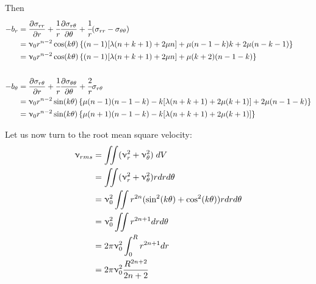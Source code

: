 Then 
\begin{align}
-b_r &=
\frac{\partial \sigma_{rr}}{\partial r} + \cfrac{1}{r}\frac{\partial \sigma_{r\theta}}{\partial \theta} +
\cfrac{1}{r}(\sigma_{rr}-\sigma_{\theta\theta})  
\nonumber\\
&= \upnu_0 r^{n-2} \cos(k\theta) 
\left\{
(n-1)[\lambda (n+k+1)+2\mu n]
+ \mu   (n-1-k)k  
+ 2 \mu( n-k-1)  
\right\}
\nonumber\\
&= \upnu_0 r^{n-2} \cos(k\theta) 
\left\{
(n-1)[\lambda (n+k+1)+2\mu n]
+ \mu (k+2)  (n-1-k)  
\right\}
\nonumber\\\nonumber\\
-b_\theta&=
\frac{\partial \sigma_{r\theta}}{\partial r} + \cfrac{1}{r}\frac{\partial \sigma_{\theta\theta}}{\partial \theta} 
+\cfrac{2}{r}\sigma_{r\theta}  
\nonumber\\ 
&= \upnu_0 r^{n-2} \sin(k\theta)
\left\{
\mu  (n-1)   (n-1-k)  
 -  k  [\lambda(n+k+1) + 2 \mu (k+1) ]
+ 2\mu     (n-1-k)  
\right\} \nonumber\\
&= 
\upnu_0 r^{n-2} \sin(k\theta)
\left\{
\mu  (n+1)   (n-1-k)  
 -  k  [\lambda(n+k+1) + 2 \mu (k+1) ]
\right\} \nonumber
\end{align}

Let us now turn to the root mean square velocity:
\begin{align}
\upnu_{rms} 
&= \iint (\upnu_r^2 + \upnu_\theta^2) \; dV \nonumber\\
&= \iint (\upnu_r^2 + \upnu_\theta^2) rdr d\theta \nonumber\\
&= \upnu_0^2 \iint r^{2n}( \sin^2(k\theta)+\cos^2(k\theta)  ) rdr d\theta \nonumber\\
&= \upnu_0^2 \iint r^{2n+1} dr d\theta \nonumber\\
&= 2 \pi \upnu_0^2 \int_0^R r^{2n+1} dr  \nonumber\\
&= 2 \pi \upnu_0^2 \frac{R^{2n+2}}{2n+2}
\end{align}


